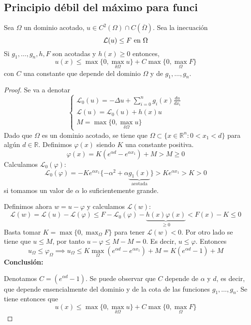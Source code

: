 \subsection{Principio débil del máximo para funci}
\begin{theorem}
Sea $\Omega$ un dominio acotado, $u\in C^2(\Omega)\cap C(\overline{\Omega})$. 
Sea la inecuación
$$\mathcal{L}(u) \le F  \text{ en } \Omega\\$$
Si $g_1,\hdots,g_n,h,F$ son acotadas y $h(x) \ge 0$ entonces,
$$u(x) \le \max\{0, \max_{\delta\Omega}u\} + C\max\{0, \max_{\Omega} F\}$$
con $C$ una constante que depende del dominio $\Omega$ y de $g_1,\hdots,g_n$.
\end{theorem}
\begin{proof}
Se va a denotar
\begin{equation*}
\left\{
\begin{array}{l}
\mathcal{L}_0(u)=-\Delta u+\sum_{i=0}^ng_i(x)\frac{du}{dx_i}\\
\mathcal{L}(u) = \mathcal{L}_0(u)+h(x)u\\
M=\max\{0,\max_{\delta\Omega}u\}
\end{array}
\right.
\end{equation*}
Dado que $\Omega$ es un dominio acotado, se tiene que
$\Omega\subset\{x\in\mathbb{R}^n: 0<x_1<d\}$ para algún $d\in\mathbb{R}$.
Definimos $\varphi(x)$ siendo $K$ una constante positiva.
$$\varphi(x)=K\left(e^{\alpha d}-e^{\alpha x_1}\right)+M > M \ge 0$$
Calculamos $\mathcal{L}_0(\varphi)$:
$$\mathcal{L}_0(\varphi)=-Ke^{\alpha x_1}\{-\alpha^2+\alpha \underbrace{g_1(x)}_{\text{acotada}}\}>Ke^{\alpha x_1} > K > 0$$
si tomamos un valor de $\alpha$ lo suficientemente grande.

\noindent Definimos ahora $w=u-\varphi$ y calculamos $\mathcal{L}(w)$:
$$\mathcal{L}(w) = \mathcal{L}(u)-\mathcal{L}(\varphi) \le F - \mathcal{L}_0(\varphi)-\underbrace{h(x)\varphi(x)}_{\ge0}<F(x)-K \le 0$$
Basta tomar $K=\max\{0, \max_{\Omega}F\}$ para tener $\mathcal{L}(w) < 0$.
Por otro lado se tiene que $u\le M$, por tanto $u-\varphi\le M - M = 0$. Es decir, $u \le \varphi$. Entonces 
$$u_\Omega \le \varphi_\Omega\implies u_\Omega \le K\max_\Omega\left(e^{\alpha d}-e^{\alpha x_1}\right) + M = K\left(e^{\alpha d}-1\right) + M$$
\textbf{Conclusión:}

Denotamos $C = \left(e^{\alpha d}-1\right)$. Se puede observar que $C$ depende de $\alpha$ y $d$, es decir, que depende ensencialmente del dominio y de la cota de las funciones $g_1,\hdots,g_n$.
Se tiene entonces que 
$$u(x) \le \max\{0, \max_{\delta\Omega}u\} + C\max\{0, \max_{\Omega} F\}$$
\end{proof}

